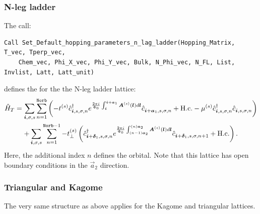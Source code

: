 \subsubsection*{N-leg ladder}
The call:
\begin{lstlisting}[style=fortran]
Call Set_Default_hopping_parameters_n_lag_ladder(Hopping_Matrix, T_vec, Tperp_vec,
    Chem_vec, Phi_X_vec, Phi_Y_vec, Bulk, N_Phi_vec, N_FL, List, Invlist, Latt, Latt_unit)
\end{lstlisting}  
defines  the   for the  the  N-leg ladder lattice:                 
\begin{multline}
\hat{H}_T  =  \sum_{\boldsymbol{i}, \sigma, s }  \sum_{n=1}^{\texttt{Norb}} \left(      - t^{(s)} \hat{c}^{\dagger}_{\boldsymbol{i},s,\sigma,n}   e^{\frac{2 \pi i}{\Phi_0} \int_{\boldsymbol{i}}^{\boldsymbol{i}+ \boldsymbol{a}_1}  \boldsymbol{A}^{(s)}(\boldsymbol{l})  d \boldsymbol{l}}   \hat{c}^{}_{\boldsymbol{i} + \boldsymbol{a}_1,s,\sigma,n} +  \mathrm{H.c.}       -  \mu^{(s)} \hat{c}^{\dagger}_{\boldsymbol{i},s,\sigma,n} \hat{c}^{}_{\boldsymbol{i},s,\sigma,n}  \right)    \\
     + \sum_{\boldsymbol{i}, \sigma, s } \sum_{n=1}^{\texttt{Norb}-1}  -  t_{\perp}^{(s)}  \left( 
                   \hat{c}^{\dagger}_{\boldsymbol{i} + \boldsymbol{\delta}_1,s,\sigma,n}  e^{\frac{2 \pi i}{\Phi_0} \int_{(n-1)\boldsymbol{a}_2}^{(n)\boldsymbol{a}_2}  \boldsymbol{A}^{(s)}(\boldsymbol{l})  d \boldsymbol{l}}    \hat{c}^{}_{\boldsymbol{i} + \boldsymbol{\delta}_1,s,\sigma,n+1}  + \mathrm{H.c.}  \right). 
\end{multline}
Here, the additional  index  $n$  defines  the orbital.  Note that this lattice  has open boundary conditions in the $\vec{a}_2$  direction. 


\subsubsection*{Triangular  and  Kagome}
The very  same structure  as above  applies  for  the  Kagome and  triangular lattices. 